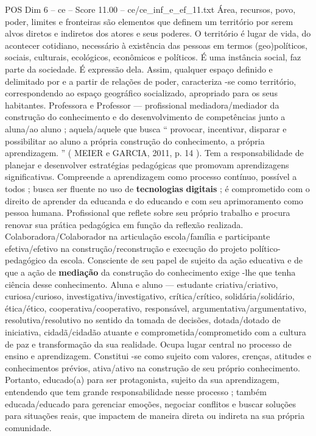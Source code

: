 \begin{textsample}{POS Dim 6 – ce – Score 11.00 – ce/ce\_inf\_e\_ef\_11.txt}
Área, recursos, povo, poder, limites e fronteiras são elementos que definem um território por serem alvos diretos e indiretos dos atores e seus poderes.
O território é lugar de vida, do acontecer cotidiano, necessário à existência das pessoas em termos (geo)políticos, sociais, culturais, ecológicos, econômicos e políticos.
É uma instância social, faz parte da sociedade.
É expressão dela.
Assim, qualquer espaço definido e delimitado por e a partir de relações de poder, caracteriza -se como território, correspondendo ao espaço geográfico socializado, apropriado para os seus habitantes.
Professora e Professor — profissional mediadora/mediador da construção do conhecimento e do desenvolvimento de competências junto a aluna/ao aluno ; aquela/aquele que busca “ provocar, incentivar, disparar e possibilitar ao aluno a própria construção do conhecimento, a própria aprendizagem. ” ( MEIER e GARCIA, 2011, p. 14 ).
Tem a responsabilidade de planejar e desenvolver estratégias pedagógicas que promovam aprendizagens significativas.
Compreende a aprendizagem como processo contínuo, possível a todos ; busca ser fluente no uso de \textbf{tecnologias} \textbf{digitais} ; é comprometido com o direito de aprender da educanda e do educando e com seu aprimoramento como pessoa humana.
Profissional que reflete sobre seu próprio trabalho e procura renovar sua prática pedagógica em função da reflexão realizada.
Colaboradora/Colaborador na articulação escola/família e participante efetiva/efetivo na construção/reconstrução e execução do projeto político-pedagógico da escola.
Consciente de seu papel de sujeito da ação educativa e de que a ação de \textbf{mediação} da construção do conhecimento exige -lhe que tenha ciência desse conhecimento.
Aluna e aluno — estudante criativa/criativo, curiosa/curioso, investigativa/investigativo, crítica/crítico, solidária/solidário, ética/ético, cooperativa/cooperativo, responsável, argumentativa/argumentativo, resolutiva/resolutivo no sentido da tomada de decisões, dotada/dotado de iniciativa, cidadã/cidadão atuante e comprometida/comprometido com a cultura de paz e transformação da sua realidade.
Ocupa lugar central no processo de ensino e aprendizagem.
Constitui -se como sujeito com valores, crenças, atitudes e conhecimentos prévios, ativa/ativo na construção de seu próprio conhecimento.
Portanto, educado(a) para ser protagonista, sujeito da sua aprendizagem, entendendo que tem grande responsabilidade nesse processo ; também educada/educado para gerenciar emoções, negociar conflitos e buscar soluções para situações reais, que impactem de maneira direta ou indireta na sua própria comunidade.

\end{textsample}
